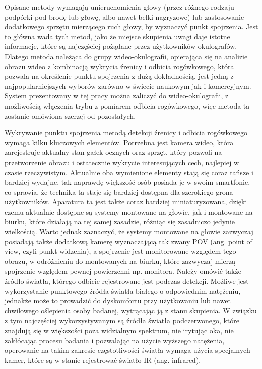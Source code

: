 \documentclass[a4paper,twoside,12pt]{book}
\begin{document}
Opisane metody wymagają unieruchomienia głowy (przez różnego rodzaju podpórki pod brodę lub głowę, albo nawet belki nagryzowe) lub zastosowanie dodatkowego sprzętu mierzącego ruch głowy, by wyznaczyć punkt spojrzenia. Jest to główna wada tych metod, jako że miejsce skupienia uwagi daje istotne informacje, które są najczęściej pożądane przez użytkowników okulografów. Dlatego metoda należąca do grupy wideo-okulografii, opierająca się na analizie obrazu wideo z kombinacją wykrycia źrenicy i odbicia rogówkowego, która pozwala na określenie punktu spojrzenia z dużą dokładnością, jest jedną z najpopularniejszych wyborów zarówno w świecie naukowym jak i komercyjnym. System prezentowany w tej pracy można zaliczyć do wideo-okulografii, z możliwością włączenia trybu z pomiarem odbicia rogówkowego, więc metoda ta zostanie omówiona szerzej od pozostałych.

Wykrywanie punktu spojrzenia metodą detekcji źrenicy i odbicia rogówkowego wymaga kilku kluczowych elementów. Potrzebna jest kamera wideo, która zarejestruje aktualny stan gałek ocznych oraz sprzęt, który pozwoli na przetworzenie obrazu i ostatecznie wykrycie interesujących cech, najlepiej w czasie rzeczywistym. Aktualnie oba wymienione elementy stają się coraz tańsze i bardziej wydajne, tak naprawdę większość osób posiada je w swoim smartfonie, co sprawia, że technika ta staje się bardziej dostępna dla szerokiego grona użytkowników. Aparatura ta jest także coraz bardziej miniaturyzowana, dzięki czemu aktualnie dostępne są systemy montowane na głowie, jak i montowane na biurku, które działają na tej samej zasadzie, różniąc się zasadniczo jedynie wielkością. Warto jednak zaznaczyć, że systemy montowane na głowie zazwyczaj posiadają także dodatkową kamerę wyznaczającą tak zwany POV (ang. point of view, czyli punkt widzenia), a spojrzenie jest monitorowane względem tego obrazu, w odróżnieniu do montowanych na biurku, które zazwyczaj mierzą spojrzenie względem pewnej powierzchni np. monitora. Należy omówić także źródło światła, którego odbicie rejestrowane jest podczas detekcji. Możliwe jest wykorzystanie punktowego źródła światła białego o odpowiednim natężeniu, jednakże może to prowadzić do dyskomfortu przy użytkowaniu lub nawet chwilowego oślepienia osoby badanej, wytrącając ją z stanu skupienia. W związku z tym najczęściej wykorzystywanym są źródła światła podczerwonego, które znajdują się w większości poza widzialnym spektrum, nie irytując oka, nie zakłócając procesu badania i pozwalając na użycie wyższego natężenia, operowanie na takim zakresie częstotliwości światła wymaga użycia specjalnych kamer, które są w stanie rejestrować światło IR (ang. infrared). 
\end{document}
